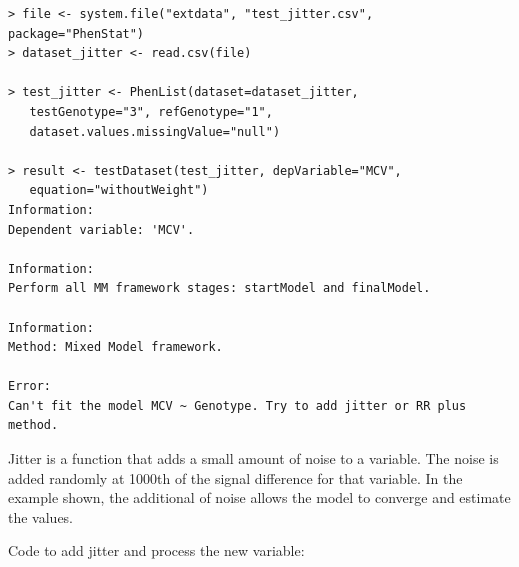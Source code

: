 \documentclass[12pt,a4paper]{article}
\begin{document}
\begingroup
    \fontsize{8pt}{12pt}\selectfont
\begin{verbatim}
> file <- system.file("extdata", "test_jitter.csv", package="PhenStat") 
> dataset_jitter <- read.csv(file)

> test_jitter <- PhenList(dataset=dataset_jitter, 
   testGenotype="3", refGenotype="1",
   dataset.values.missingValue="null")
   
> result <- testDataset(test_jitter, depVariable="MCV", 
   equation="withoutWeight")
Information:
Dependent variable: 'MCV'.

Information:
Perform all MM framework stages: startModel and finalModel.

Information:
Method: Mixed Model framework.

Error:
Can't fit the model MCV ~ Genotype. Try to add jitter or RR plus method.
\end{verbatim}
\endgroup

Jitter is a function that adds a small amount of noise to a variable.  The noise is added randomly at 1000th of the signal difference for that variable.  In the example shown, the additional of noise allows the model to converge and estimate the values.
  
Code to add jitter and process the new variable:
\end{document}
